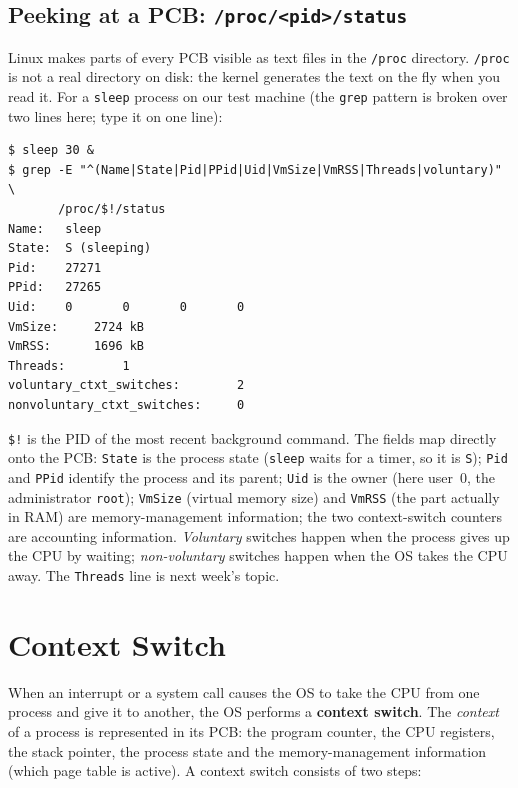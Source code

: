 \documentclass[11pt,a4paper]{article}
\newcommand{\term}[1]{\textbf{\color{mintdeep}#1}}
\newcommand{\cmd}[1]{\texttt{#1}}
\begin{document}
\subsection{Peeking at a PCB: \texttt{/proc/<pid>/status}}

Linux makes parts of every PCB visible as text files in the \texttt{/proc} directory. \texttt{/proc} is not a real directory on disk: the kernel generates the text on the fly when you read it. For a \cmd{sleep} process on our test machine (the \cmd{grep} pattern is broken over two lines here; type it on one line):

\begin{lstlisting}[style=term]
$ sleep 30 &
$ grep -E "^(Name|State|Pid|PPid|Uid|VmSize|VmRSS|Threads|voluntary)" \
       /proc/$!/status
Name:   sleep
State:  S (sleeping)
Pid:    27271
PPid:   27265
Uid:    0       0       0       0
VmSize:     2724 kB
VmRSS:      1696 kB
Threads:        1
voluntary_ctxt_switches:        2
nonvoluntary_ctxt_switches:     0
\end{lstlisting}

\verb|$!| is the PID of the most recent background command. The fields map directly onto the PCB: \texttt{State} is the process state (\cmd{sleep} waits for a timer, so it is \texttt{S}); \texttt{Pid} and \texttt{PPid} identify the process and its parent; \texttt{Uid} is the owner (here user~$0$, the administrator \texttt{root}); \texttt{VmSize} (virtual memory size) and \texttt{VmRSS} (the part actually in RAM) are memory-management information; the two context-switch counters are accounting information. \emph{Voluntary} switches happen when the process gives up the CPU by waiting; \emph{non-voluntary} switches happen when the OS takes the CPU away. The \texttt{Threads} line is next week's topic.

\section{Context Switch}
\label{sec:ctx}

When an interrupt or a system call causes the OS to take the CPU from one process and give it to another, the OS performs a \term{context switch}. The \emph{context} of a process is represented in its PCB: the program counter, the CPU registers, the stack pointer, the process state and the memory-management information (which page table is active). A context switch consists of two steps:
\end{document}

